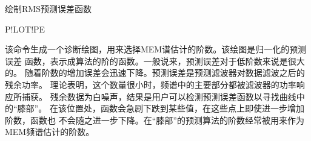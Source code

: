 \label{spe:plotpe}

绘制RMS预测误差函数

\begin{SACSTX}
P!LOT!PE
\end{SACSTX}

该命令生成一个诊断绘图，用来选择MEM谱估计的阶数。该绘图是归一化的预测误差
函数，表示成算法的阶的函数。一般说来，预测误差对于低阶数来说是很大的。
随着阶数的增加误差会迅速下降。预测误差是预测滤波器对数据滤波之后的残余功率。
理论表明，这个数量很小时，频谱中的主要部分都被滤波器的功率响应所捕获。
残余数据为白噪声，结果是用户可以检测预测误差函数以寻找曲线中的``膝部''。
在该位置处，函数会急剧下跌到某些值，在这些点上即使进一步增加阶数，函数也
不会随之进一步下降。在``膝部''的预测算法的阶数经常被用来作为MEM频谱估计的阶数。
